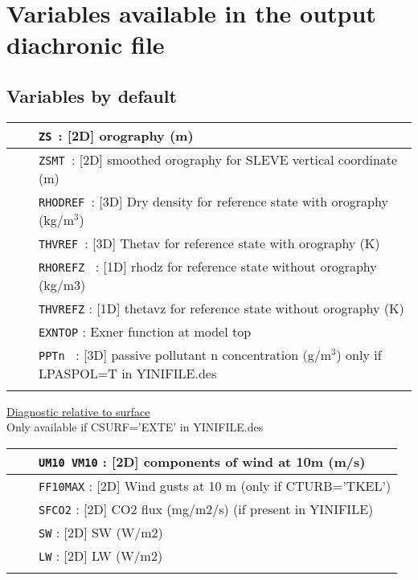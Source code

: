 \section{Variables available in the output diachronic file} \label{s:diag_list}

\subsection{Variables by default}
\begin{center}
\begin{tabular}{>{\centering}p{3cm}>{\centering}p{2.5cm}|p{11cm}|}
\cline{3-3}
&&{\tt ZS }: [2D] orography (m)  \\ \cline{3-3}
&&{\tt ZSMT }: [2D] smoothed orography for SLEVE vertical coordinate (m)  \\ \cline{3-3}
&&{\tt RHODREF }: [3D] Dry density for reference state with orography (kg/m$^3$)  \\ \cline{3-3}
&&{\tt THVREF }: [3D] Thetav for reference state with orography (K)  \\ \cline{3-3}
&&{\tt RHOREFZ } : [1D] rhodz for reference state without orography (kg/m3)  \\ \cline{3-3}
&&{\tt THVREFZ} : [1D] thetavz for reference state without orography (K) \\ \cline{3-3}
&&{\tt EXNTOP} :  Exner function at model top\\ \cline{3-3}
&&{\tt PPTn } : [3D] passive pollutant n concentration (g/m$^3$) only if LPASPOL=T in YINIFILE.des\\ \cline{3-3}
\end{tabular} 
\end{center}
\underline{Diagnostic relative to surface}\\
Only available if CSURF='EXTE' in YINIFILE.des
\begin{center}
\begin{tabular}{>{\centering}p{3cm}>{\centering}p{2.5cm}|p{11cm}|}
\cline{3-3}
&&{\tt UM10 VM10} : [2D] components of wind at 10m (m/s)\\\cline{3-3}
&&{\tt FF10MAX} : [2D] Wind gusts at 10 m (only if CTURB='TKEL')\\ \cline{3-3}
&&{\tt SFCO2} : [2D] CO2 flux (mg/m2/s) (if present in YINIFILE)\\ \cline{3-3}
&&{\tt SW} : [2D] SW (W/m2)\\ \cline{3-3}
&&{\tt LW} : [2D] LW (W/m2) \\ \cline{3-3}
\end{tabular} 
\end{center}

